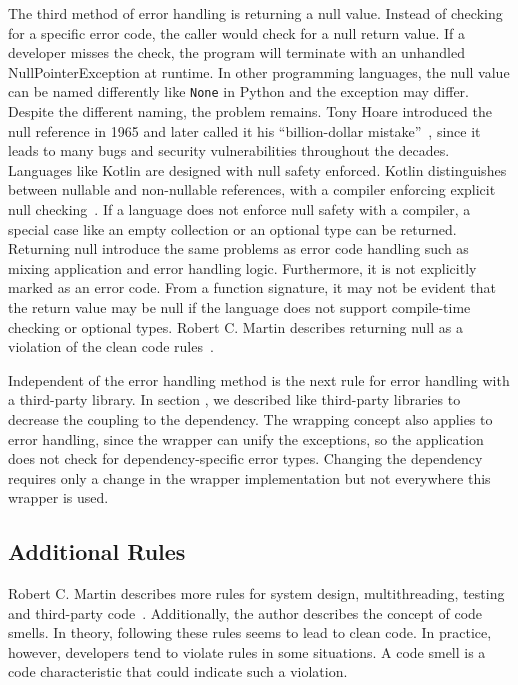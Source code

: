 The third method of error handling is returning a null value. Instead of checking for a specific error code, the caller would check for a null return value. If a developer misses the check, the program will terminate with an unhandled NullPointerException at runtime. In other programming languages, the null value can be named differently like \texttt{None} in Python and the exception may differ. Despite the different naming, the problem remains. Tony Hoare introduced the null reference in 1965 and later called it his \enquote{billion-dollar mistake}~\cite{hoare_null_2009}, since it leads to many bugs and security vulnerabilities throughout the decades. Languages like Kotlin are designed with null safety enforced. Kotlin distinguishes between nullable and non-nullable references, with a compiler enforcing explicit null checking~\cite{noauthor_null_nodate}. If a language does not enforce null safety with a compiler, a special case like an empty collection or an optional type can be returned. 
Returning null introduce the same problems as error code handling such as mixing application and error handling logic. Furthermore, it is not explicitly marked as an error code. From a function signature, it may not be evident that the return value may be null if the language does not support compile-time checking or optional types. Robert C. Martin describes returning null as a violation of the clean code rules~\cite{martin_clean_2009}.

Independent of the error handling method is the next rule for error handling with a third-party library. In section , we described  like third-party libraries to decrease the coupling to the dependency. The wrapping concept also applies to error handling, since the wrapper can unify the exceptions, so the application does not check for dependency-specific error types. Changing the dependency requires only a change in the wrapper implementation but not everywhere this wrapper is used. 

\subsection{Additional Rules}
Robert C. Martin describes more rules for system design, multithreading, testing and third-party code~\cite{martin_clean_2009}. 
Additionally, the author describes the concept of code smells. In theory, following these rules seems to lead to clean code. In practice, however, developers tend to violate rules in some situations. A code smell is a code characteristic that could indicate such a violation.

